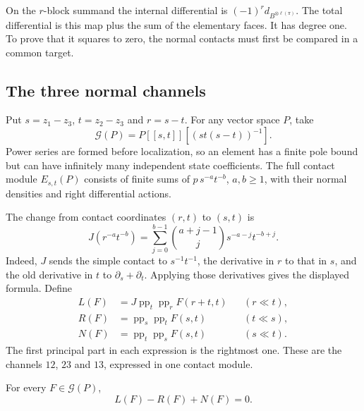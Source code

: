 On the \(r\)-block summand the internal differential is
\((-1)^r d_{B^{\otimes\ell(\pi)}}\). The total differential
is this map plus the sum of the elementary faces.
It has degree one. To prove that it squares to zero, the
normal contacts must first be compared in a common target.

\subsection{The three normal channels}

Put \(s=z_1-z_3\), \(t=z_2-z_3\) and \(r=s-t\).
For any vector space \(P\), take
\[
 \mathcal G(P)=P[[s,t]][(st(s-t))^{-1}].
\]
Power series are formed before localization, so an element
has a finite pole bound but can have infinitely many
independent state coefficients. The full contact module
\(E_{s,t}(P)\) consists of finite sums of
\(p\,s^{-a}t^{-b}\), \(a,b\geq1\), with their normal
densities and right differential actions.

The change from contact coordinates \((r,t)\) to \((s,t)\)
is
\begin{equation}\label{v4-eq:regular-contact-transfer}
 J(r^{-a}t^{-b})
       =\sum_{j=0}^{b-1}\binom{a+j-1}{j}
                   s^{-a-j}t^{-b+j}.
\end{equation}
Indeed, \(J\) sends the simple contact to \(s^{-1}t^{-1}\),
the derivative in \(r\) to that in \(s\), and the old
derivative in \(t\) to \(\partial_s+\partial_t\).
Applying those derivatives gives the displayed formula.
Define
\[
 \begin{aligned}
 L(F)&=J\operatorname{pp}_t\operatorname{pp}_rF(r+t,t)
                                      &&(r\ll t),\\
 R(F)&=\operatorname{pp}_s\operatorname{pp}_tF(s,t)
                                      &&(t\ll s),\\
 N(F)&=\operatorname{pp}_t\operatorname{pp}_sF(s,t)
                                      &&(s\ll t).
 \end{aligned}
\]
The first principal part in each expression is the rightmost
one. These are the channels \(12\), \(23\) and \(13\),
expressed in one contact module.

\begin{lemma}\label{v4-lem:regular-three-channel}
For every \(F\in\mathcal G(P)\),
\[
                         L(F)-R(F)+N(F)=0.
\]
\end{lemma}

